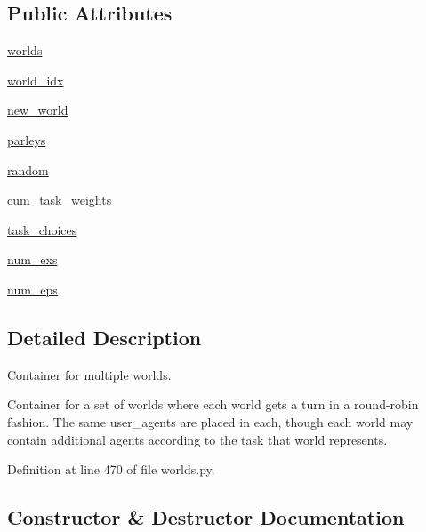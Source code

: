 \subsection*{Public Attributes}
\begin{DoxyCompactItemize}
\item 
\hyperlink{classparlai_1_1core_1_1worlds_1_1MultiWorld_afd4cbc3c724de6b6bf8f55e6fc56964e}{worlds}
\item 
\hyperlink{classparlai_1_1core_1_1worlds_1_1MultiWorld_a3d2a0158d96bed4eead1e3b4138d5242}{world\+\_\+idx}
\item 
\hyperlink{classparlai_1_1core_1_1worlds_1_1MultiWorld_ac88454a3fca862db7f00fb165b483dc5}{new\+\_\+world}
\item 
\hyperlink{classparlai_1_1core_1_1worlds_1_1MultiWorld_aa4332cdcbb6a8f91d55fbdeaa412cbe3}{parleys}
\item 
\hyperlink{classparlai_1_1core_1_1worlds_1_1MultiWorld_aa8e5d1fe78cd5ad37c142c95ff2a0a76}{random}
\item 
\hyperlink{classparlai_1_1core_1_1worlds_1_1MultiWorld_aa4264dd13f5d8e7f7883e3afd6d726e7}{cum\+\_\+task\+\_\+weights}
\item 
\hyperlink{classparlai_1_1core_1_1worlds_1_1MultiWorld_af84190b29a206943d32a09e70301a5a2}{task\+\_\+choices}
\item 
\hyperlink{classparlai_1_1core_1_1worlds_1_1MultiWorld_a97cb387aa6641126af73571731042ece}{num\+\_\+exs}
\item 
\hyperlink{classparlai_1_1core_1_1worlds_1_1MultiWorld_a6f874903b97f9bfd44354223ae38679e}{num\+\_\+eps}
\end{DoxyCompactItemize}


\subsection{Detailed Description}
\begin{DoxyVerb}Container for multiple worlds.

Container for a set of worlds where each world gets a turn
in a round-robin fashion. The same user_agents are placed in each,
though each world may contain additional agents according to the task
that world represents.
\end{DoxyVerb}
 

Definition at line 470 of file worlds.\+py.



\subsection{Constructor \& Destructor Documentation}
\mbox{\label{classparlai_1_1core_1_1worlds_1_1MultiWorld_abe32f537dd97543bbfdf51d417d81d9b}} 
